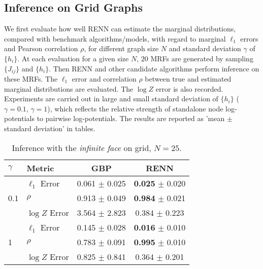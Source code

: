 \subsection{Inference on Grid Graphs}

We first evaluate how well RENN can estimate the marginal distributions, compared with benchmark algorithms/models, with regard to marginal $\ell_1$ errors and Pearson correlation $\rho$, for different graph size $N$ and standard deviation $\gamma$ of $\{h_i\}$. At each evaluation for a given size $N$, $20$ MRFs are generated by sampling $\{J_{ij}\}$ and $\{h_i\}$. Then RENN and other candidate algorithms perform inference on these MRFs. The $\ell_1$ error and correlation $\rho$ between true and estimated marginal distributions are evaluated. The $\log{Z}$ error is also recorded.
Experiments are carried out in large and small standard deviation of $\{h_i\}$ ($\gamma=0.1$, $\gamma=1$), which reflects the relative strength of standalone node log-potentials to pairwise log-potentials. The results are reported as 'mean $\pm$ standard deviation' in tables.

\begin{table}[tp!]
  \caption{Inference with the \textit{infinite face} on grid, $N=25$.}
  \label{tab:infer-infinite-face}
  \begin{center}
    \begin{small}
      
      \begin{tabular}{llcc}
        \toprule
        $\gamma$ & Metric & GBP & RENN \\
        \midrule
        \multirow{3}{*}{0.1}
                 & $\ell_1$ Error & 0.061 $\pm$ 0.025 & \textbf{0.025} $\pm$ 0.020 \\

                 & $\rho$   & 0.913 $\pm$ 0.049  &  \textbf{0.984} $\pm$ 0.021  \\
                 & $\log{Z}$ Error & 3.564 $\pm$ 2.823  &  0.384 $\pm$ 0.223  \\
        \midrule
        \multirow{3}{*}{1}
                 & $\ell_1$ Error & 0.145 $\pm$ 0.028  & \textbf{0.016} $\pm$ 0.010 \\

                 & $\rho$   & 0.783 $\pm$ 0.091  &  \textbf{0.995} $\pm$ 0.010 \\
                 & $\log{Z}$ Error & 0.825 $\pm$ 0.841  & 0.364 $\pm$ 0.201 \\
        
        \bottomrule
      \end{tabular}

    \end{small}
  \end{center}
\end{table}







